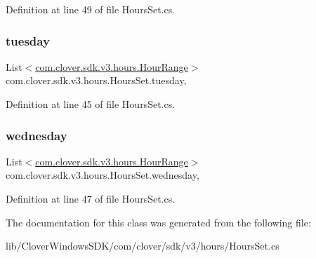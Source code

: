 Definition at line 49 of file Hours\+Set.\+cs.

\mbox{\label{classcom_1_1clover_1_1sdk_1_1v3_1_1hours_1_1_hours_set_a065021afe719bb863aaccf5d4ec8c777}} 
\subsubsection{\texorpdfstring{tuesday}{tuesday}}
{\footnotesize\ttfamily List$<$\hyperlink{classcom_1_1clover_1_1sdk_1_1v3_1_1hours_1_1_hour_range}{com.\+clover.\+sdk.\+v3.\+hours.\+Hour\+Range}$>$ com.\+clover.\+sdk.\+v3.\+hours.\+Hours\+Set.\+tuesday\hspace{0.3cm}{\ttfamily [get]}, {\ttfamily [set]}}



Definition at line 45 of file Hours\+Set.\+cs.

\mbox{\label{classcom_1_1clover_1_1sdk_1_1v3_1_1hours_1_1_hours_set_a4d70e383d21b1da7f78c2cf3a839eaad}} 
\subsubsection{\texorpdfstring{wednesday}{wednesday}}
{\footnotesize\ttfamily List$<$\hyperlink{classcom_1_1clover_1_1sdk_1_1v3_1_1hours_1_1_hour_range}{com.\+clover.\+sdk.\+v3.\+hours.\+Hour\+Range}$>$ com.\+clover.\+sdk.\+v3.\+hours.\+Hours\+Set.\+wednesday\hspace{0.3cm}{\ttfamily [get]}, {\ttfamily [set]}}



Definition at line 47 of file Hours\+Set.\+cs.



The documentation for this class was generated from the following file\+:\begin{DoxyCompactItemize}
\item 
lib/\+Clover\+Windows\+S\+D\+K/com/clover/sdk/v3/hours/Hours\+Set.\+cs\end{DoxyCompactItemize}
